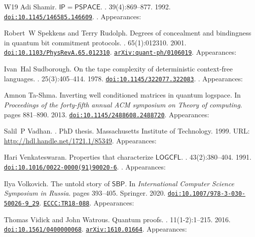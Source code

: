 \documentclass[10pt,a4paper]{article}
\numberwithin{equation}{section}
\numberwithin{figure}{section}
\begin{document}
\begin{thebibliography}{{}W19}
Adi Shamir.
\newblock $\mathsf{IP}=\mathsf{PSPACE}$.
. 39(4):869--877. 1992.
\newblock \href {https://doi.org/10.1145/146585.146609} {\texttt{doi:10.1145/146585.146609}}. . Appearances:\!

Robert~W Spekkens and Terry Rudolph.
\newblock Degrees of concealment and bindingness in quantum bit commitment protocols.
. 65(1):012310. 2001.
\newblock \href {https://doi.org/10.1103/PhysRevA.65.012310} {\texttt{doi:10.1103/PhysRevA.65.012310}}. \href {https://arxiv.org/abs/quant-ph/0106019} {\texttt{arXiv:quant-ph/0106019}}. Appearances:\!

Ivan~Hal Sudborough.
\newblock On the tape complexity of deterministic context-free languages.
. 25(3):405--414. 1978.
\newblock \href {https://doi.org/10.1145/322077.322083} {\texttt{doi:10.1145/322077.322083}}. . Appearances:\!

Amnon Ta-Shma.
\newblock Inverting well conditioned matrices in quantum logspace.
\newblock In {\em Proceedings of the forty-fifth annual ACM symposium on Theory of computing}. pages 881--890. 2013.
\newblock \href {https://doi.org/10.1145/2488608.2488720} {\texttt{doi:10.1145/2488608.2488720}}. Appearances:\!

Salil~P Vadhan.
.
\newblock PhD thesis. Massachusetts Institute of Technology. 1999.
\newblock URL: \url{http://hdl.handle.net/1721.1/85349}. Appearances:\!

Hari Venkateswaran.
\newblock Properties that characterize $\mathsf{LOGCFL}$.
. 43(2):380--404. 1991.
\newblock \href {https://doi.org/10.1016/0022-0000(91)90020-6} {\texttt{doi:10.1016/0022-0000(91)90020-6}}. . Appearances:\!

Ilya Volkovich.
\newblock The untold story of $\mathsf{SBP}$.
\newblock In {\em International Computer Science Symposium in Russia}. pages 393--405. Springer. 2020.
\newblock \href {https://doi.org/10.1007/978-3-030-50026-9\_29} {\texttt{doi:10.1007/978-3-030-50026-9\_29}}. \href {https://eccc.weizmann.ac.il/report/2018/088} {\texttt{ECCC:TR18-088}}. Appearances:\!

Thomas Vidick and John Watrous.
\newblock Quantum proofs.
. 11(1-2):1--215. 2016.
\newblock \href {https://doi.org/10.1561/0400000068} {\texttt{doi:10.1561/0400000068}}. \href {https://arxiv.org/abs/1610.01664} {\texttt{arXiv:1610.01664}}. Appearances:\!


\end{thebibliography}
\end{document}
